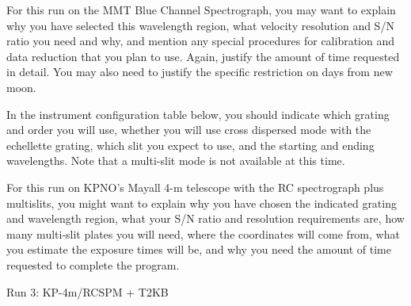 


\technicaldescription
For this run on the MMT Blue Channel Spectrograph, you may want to explain
why you have selected this wavelength region, what velocity resolution
and S/N ratio you need and why, and mention any special procedures for
calibration and data reduction that you plan to use.  Again, justify
the amount of time requested in detail.  You may also need to justify
the specific restriction on days from new moon.

In the instrument configuration table below, you should indicate which
grating and order you will use, whether you will use cross dispersed
mode with the echellette grating, which slit you expect to use, and
the starting and ending wavelengths.  Note that a multi-slit mode
is not available at this time.

\begin{configuration}
\filters{}
\multislit{}            
\cable{}
\corrector{}            
\collimator{}             
\adc{}
\end{configuration}

\specialrequest






\technicaldescription
For this run on KPNO's Mayall 4-m telescope with the RC spectrograph
plus multislits, you might want to explain why you have chosen the 
indicated grating and wavelength region, what your S/N ratio and resolution
requirements are, how many multi-slit plates you will need, where the
coordinates will come from, what you estimate the exposure times will
be, and why you need the amount of time requested to complete the program.

\begin{configuration}
\crossdisperser{}       
\slit{}
\cable{}
\corrector{}            
\collimator{}             
\adc{}
\end{configuration}

\specialrequest

\begin{targettable}{Run 3: KP-4m/RCSPM + T2KB}

\obscomment{}

\obscomment{}

\obscomment{}

\end{targettable}



